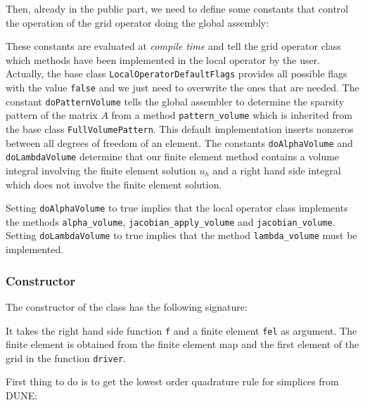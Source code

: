 \documentclass[a4paper,12pt]{article}
\begin{document}
Then, already in the public part, we need to define some constants that
control the operation of the grid operator doing the global assembly:

These constants are evaluated at {\em compile time} and tell
the grid operator class which methods have been implemented
in the local operator by the user. Actually, the base class 
\lstinline{LocalOperatorDefaultFlags} provides all possible flags
with the value \lstinline{false} and we just need to overwrite the
ones that are needed.
The constant \lstinline{doPatternVolume}
tells the global assembler to determine the sparsity pattern of the
matrix $A$ from a method \lstinline{pattern_volume} which
is inherited from the base class \lstinline{FullVolumePattern}.
This default implementation inserts nonzeros between all degrees
of freedom of an element. The constants \lstinline{doAlphaVolume}
and \lstinline{doLambdaVolume} determine that
our finite element method contains a volume integral involving the
finite element solution $u_h$ and a right hand side integral which
does not involve the finite element solution.

Setting \lstinline{doAlphaVolume} to true implies that the local operator
class implements the methods \lstinline{alpha_volume}, 
\lstinline{jacobian_apply_volume} and \lstinline{jacobian_volume}.
Setting \lstinline{doLambdaVolume} to true implies that 
the method \lstinline{lambda_volume} must be implemented.

\subsubsection*{Constructor}

The constructor of the class has the following signature:

It takes the right hand side function \lstinline{f} and
a finite element \lstinline{fel} as argument. The finite element is
obtained from the finite element map and the first element of the grid
in the function \lstinline{driver}.

First thing to do is to get the lowest order quadrature rule for
simplices from DUNE:

\end{document}
